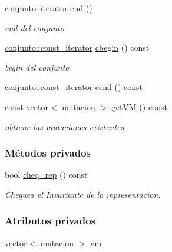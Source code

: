 \begin{DoxyCompactItemize}
\hyperlink{classconjunto_a6de33afebdfa3ec058e9c78f28854311}{conjunto\+::iterator} \hyperlink{classconjunto_adeef17ca21f1fb29f803790c89c1fc56}{end} ()
\begin{DoxyCompactList}\small\item\em end del conjunto \end{DoxyCompactList}\item 
\hyperlink{classconjunto_aa3cf9f1ee3fc1682b221c33d9f271e2e}{conjunto\+::const\+\_\+iterator} \hyperlink{classconjunto_aea13fde96ef2566de65be9a8163b1c26}{cbegin} () const 
\begin{DoxyCompactList}\small\item\em begin del conjunto \end{DoxyCompactList}\item 
\hyperlink{classconjunto_aa3cf9f1ee3fc1682b221c33d9f271e2e}{conjunto\+::const\+\_\+iterator} \hyperlink{classconjunto_a8f641464f071358f97c6f4a2c59f2117}{cend} () const 
\item 
const vector$<$ mutacion $>$ \hyperlink{classconjunto_a0193e4e35a9058612ecbf281dc41e670}{get\+VM} () const 
\begin{DoxyCompactList}\small\item\em obtiene las mutaciones existentes \end{DoxyCompactList}\end{DoxyCompactItemize}
\subsubsection*{Métodos privados}
\begin{DoxyCompactItemize}
\item 
bool \hyperlink{classconjunto_adb0ff15cf65817b0b279bae4bf06decb}{cheq\+\_\+rep} () const 
\begin{DoxyCompactList}\small\item\em Chequea el Invariante de la representacion. \end{DoxyCompactList}\end{DoxyCompactItemize}
\subsubsection*{Atributos privados}
\begin{DoxyCompactItemize}
\item 
vector$<$ mutacion $>$ \hyperlink{classconjunto_ac85e51076195e0c74574c72d2dffa728}{vm}
\end{DoxyCompactItemize}


